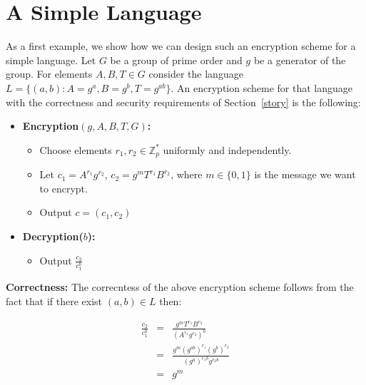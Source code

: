 \documentclass[12pt]{tufte-book}
\begin{document}
\section{A Simple Language }

As a first example, we show how we can design such an encryption scheme for a simple language. Let $G$ be a group of prime order and  $g$ be a generator of the group. For elements $A, B, T \in G$ consider the language $L = \{(a,b): A = g^a, B = g^b, T = g^{ab} \}$. An encryption scheme for that language with the correctness and security requirements of Section~\ref{story} is the following:

\smallskip

\begin{itemize}

\item \textbf{Encryption$(g,A,B,T,G)$:}

\begin{itemize}
\item Choose elements $r_1, r_2 \in \mathbb{Z}_p^*$ uniformly and independently.

\item Let $c_1 = A^{r_1} g^{r_2} $, $c_2 =  g^m T^{r_1} B^{r_2}$, where $m \in \{0,1\}$ is the message we want to encrypt.

\item Output $c = (c_1, c_2)$

\end{itemize}

\item \textbf{Decryption($b$):}


\begin{itemize}

\item Output $\frac{c_2}{c_1^b}$

\end{itemize}

\end{itemize}


\textbf{Correctness:}
The correcntess of the above encryption scheme follows from the fact that if there exist $(a,b) \in L$ then:

\begin{eqnarray*}
\frac{c_2}{c_1^b} & = &  \frac{g^m T^{r_1} B^{r_2}  }{ \left( A^{r_1}g^{r_2}\right)^b } \\
& = & \frac{g^m \left(g^{ab}\right)^{r_1} \left( g^{b} \right)^{r_2}  }{ \left( g^{a} \right)^{r_1 b} g^{r_2 b} } \\
& = & g^{m}
\end{eqnarray*}
\end{document}
